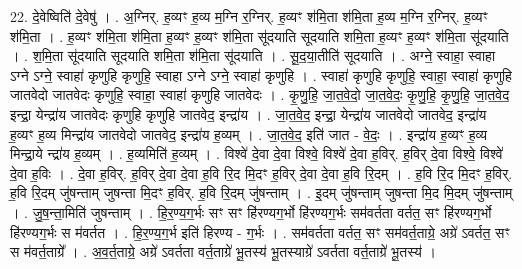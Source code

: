 \documentclass[17pt]{extarticle}
\begin{document}
22. दे॒वेष्विति॑ दे॒वेषु॑ । . अ॒ग्निर्. ह॒व्यꣳ ह॒व्य म॒ग्नि र॒ग्निर्. ह॒व्यꣳ श॑मि॒ता श॑मि॒ता ह॒व्य म॒ग्नि र॒ग्निर्. ह॒व्यꣳ श॑मि॒ता । . ह॒व्यꣳ श॑मि॒ता श॑मि॒ता ह॒व्यꣳ ह॒व्यꣳ श॑मि॒ता सू॑दयाति सूदयाति शमि॒ता ह॒व्यꣳ ह॒व्यꣳ श॑मि॒ता सू॑दयाति । . श॒मि॒ता सू॑दयाति सूदयाति शमि॒ता श॑मि॒ता सू॑दयाति । . सू॒द॒या॒तीति॑ सूदयाति । . अग्ने॒ स्वाहा॒ स्वाहा ऽग्ने ऽग्ने॒ स्वाहा॑ कृणुहि कृणुहि॒ स्वाहा ऽग्ने ऽग्ने॒ स्वाहा॑ कृणुहि । . स्वाहा॑ कृणुहि कृणुहि॒ स्वाहा॒ स्वाहा॑ कृणुहि जातवेदो जातवेदः कृणुहि॒ स्वाहा॒ स्वाहा॑ कृणुहि जातवेदः । . कृ॒णु॒हि॒ जा॒त॒वे॒दो॒ जा॒त॒वे॒दः॒ कृ॒णु॒हि॒ कृ॒णु॒हि॒ जा॒त॒वे॒द॒ इन्द्रा॒ येन्द्रा॑य जातवेदः कृणुहि कृणुहि जातवेद॒ इन्द्रा॑य । . जा॒त॒वे॒द॒ इन्द्रा॒ येन्द्रा॑य जातवेदो जातवेद॒ इन्द्रा॑य ह॒व्यꣳ ह॒व्य मिन्द्रा॑य जातवेदो जातवेद॒ इन्द्रा॑य ह॒व्यम् । . जा॒त॒वे॒द॒ इति॑ जात - वे॒दः॒ । . इन्द्रा॑य ह॒व्यꣳ ह॒व्य मिन्द्रा॒ये न्द्रा॑य ह॒व्यम् । . ह॒व्यमिति॑ ह॒व्यम् । . विश्वे॑ दे॒वा दे॒वा विश्वे॒ विश्वे॑ दे॒वा ह॒विर्. ह॒विर् दे॒वा विश्वे॒ विश्वे॑ दे॒वा ह॒विः । . दे॒वा ह॒विर्. ह॒विर् दे॒वा दे॒वा ह॒वि रि॒द मि॒दꣳ ह॒विर् दे॒वा दे॒वा ह॒वि रि॒दम् । . ह॒वि रि॒द मि॒दꣳ ह॒विर्. ह॒वि रि॒दम् जु॑षन्ताम् जुषन्ता मि॒दꣳ ह॒विर्. ह॒वि रि॒दम् जु॑षन्ताम् । . इ॒दम् जु॑षन्ताम् जुषन्ता मि॒द मि॒दम् जु॑षन्ताम् । . जु॒ष॒न्ता॒मिति॑ जुषन्ताम् । . हि॒र॒ण्य॒ग॒र्भः सꣳ सꣳ हि॑रण्यग॒र्भो हि॑रण्यग॒र्भः सम॑वर्तता वर्तत॒ सꣳ हि॑रण्यग॒र्भो हि॑रण्यग॒र्भः स म॑वर्तत । . हि॒र॒ण्य॒ग॒र्भ इति॑ हिरण्य - ग॒र्भः । . सम॑वर्तता वर्तत॒ सꣳ सम॑वर्त॒ताग्रे॒ अग्रे॑ ऽवर्तत॒ सꣳ स म॑वर्त॒ताग्रे᳚ । . अ॒व॒र्त॒ताग्रे॒ अग्रे॑ ऽवर्तता वर्त॒ताग्रे॑ भू॒तस्य॑ भू॒तस्याग्रे॑ ऽवर्तता वर्त॒ताग्रे॑ भू॒तस्य॑ । \newline
\end{document}
